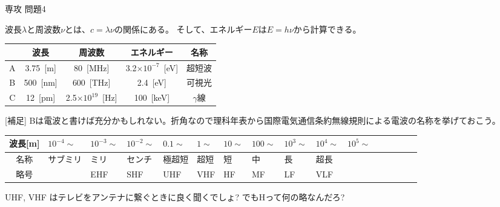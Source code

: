 \documentclass[fleqn]{jbook}
\begin{document}
\begin{answer}{専攻 問題4}{}

\begin{subanswers}
\SubAnswer

波長$\lambda$と周波数$\nu$とは、$c=\lambda\nu$の関係にある。
そして、エネルギー$E$は$E=h\nu$から計算できる。\\
\begin{center}
\begin{tabular}{|c|c|c|c|c|}
\hline
 &\bf{波長}&\bf{周波数}&\bf{エネルギー}&\bf{名称}\\
\hline
\hline
A&3.75\ [m]&80\ [MHz]%
&3.2$\times 10^{-7}$\ [eV]&超短波\\ \hline
B&500\ [nm]&600\ [THz]&2.4\ [eV]&可視光\\ \hline
C&12\ [pm]&2.5$\times 10^{19}$\ [Hz]&100\ [keV]&$\gamma$線\\ \hline
\end{tabular}
\end{center}

[補足] Bは電波と書けば充分かもしれない。折角なので理科年表から国際電気通信条約無線規則による電波の名称を挙げておこう。

\begin{tabular}{c|lllllllllllllll}
波長[m]&$10^{-4}\sim$ &$10^{-3}\sim$ &$10^{-2}\sim$ &$0.1\sim$ &$1\sim$ &$10\sim$ &$100\sim$ &$10^{3}\sim$ &$10^{4}\sim$ &$10^{5}\sim$  \\ \hline
名称&サブミリ&ミリ&センチ&極超短&超短&短&中&長&超長\\
略号&&EHF&SHF&UHF&VHF&HF&MF&LF&VLF
\end{tabular}

UHF, VHF はテレビをアンテナに繋ぐときに良く聞くでしょ?
でもHって何の略なんだろ?


\end{subanswers}
\end{answer}
\end{document}

